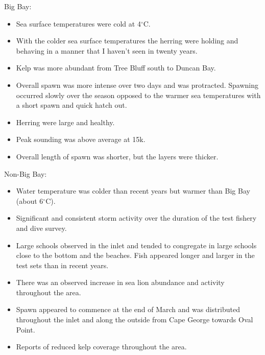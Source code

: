 Big Bay:

\begin{itemize}

\item Sea surface temperatures were cold at 4$^\circ\text{C}$.

\item With the colder sea surface temperatures the herring were holding and
behaving in a manner that I haven't seen in twenty years.

\item Kelp was more abundant from Tree Bluff south to Duncan Bay. 

\item Overall spawn was more intense over two days and was protracted.
Spawning occurred slowly over the season opposed to the warmer sea temperatures with a short spawn and quick hatch out.

\item Herring were large and healthy.

\item Peak sounding was above average at 15k.

\item Overall length of spawn was shorter, but the layers were thicker.

\end{itemize}

Non-Big Bay:

\begin{itemize}

\item Water temperature was colder than recent years but warmer than Big Bay (about 6$^\circ\text{C}$).

\item Significant and consistent storm activity over the duration of the test fishery and dive survey.

\item Large schools observed in the inlet and tended to congregate in large schools
close to the bottom and the beaches.
Fish appeared longer and larger in the test sets than in recent years.

\item There was an observed increase in sea lion abundance and activity throughout the area.

\item Spawn appeared to commence at the end of March and was distributed
throughout the inlet and along the outside from Cape George towards Oval Point.

\item Reports of reduced kelp coverage throughout the area.

\end{itemize}